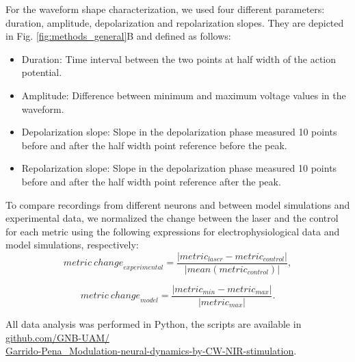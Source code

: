 For the waveform shape characterization, we used four different parameters: duration, amplitude, depolarization and repolarization slopes. They are depicted in Fig. \ref{fig:methods_general}B and defined as follows:
\begin{itemize}
    \item Duration: Time interval between the two points at half width of the action potential. 
    \item Amplitude: Difference between minimum and maximum voltage values in the waveform. 
    \item Depolarization slope: Slope in the depolarization phase measured 10 points before and after the half width point reference before the peak.
    \item Repolarization slope: Slope in the depolarization phase measured 10 points before and after the half width point reference after the peak.
\end{itemize}

To compare recordings from different neurons and between model simulations and experimental data, we normalized the change between the laser and the control for each metric using the following expressions for electrophysiological data and model simulations, respectively:
\begin{equation}
    {metric\ change}_{experimental} = \frac{|metric_{laser} - metric_{control}|}{|mean(metric_{control})|},
\end{equation}

\begin{equation}
    {metric\ change}_{model} = \frac{|metric_{min} - metric_{max}|}{|metric_{max}|}.
\end{equation}

All data analysis was performed in Python, the scripts are available in \href{https://github.com/GNB-UAM/Garrido-Pena_Modulation-neural-dynamics-by-CW-NIR-stimulation}{github.com/GNB-UAM/\\Garrido-Pena\_Modulation-neural-dynamics-by-CW-NIR-stimulation}.


